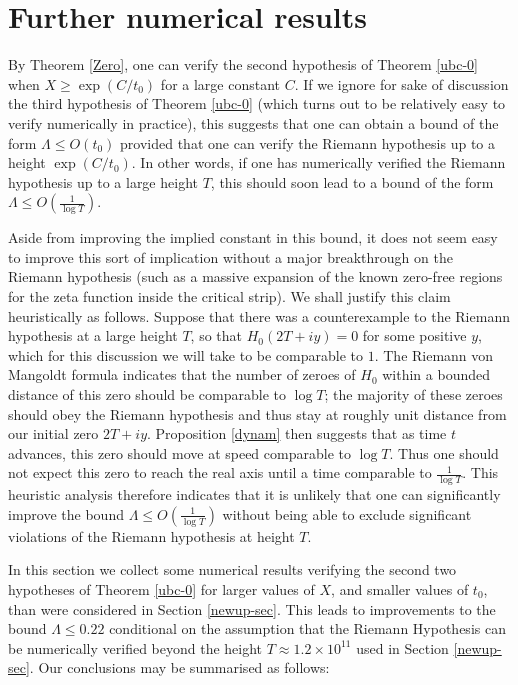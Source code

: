 \section{Further numerical results}\label{further-sec}

By Theorem \ref{Zero}, one can verify the second hypothesis of Theorem \ref{ubc-0} when $X \geq \exp(C/t_0)$ for a large constant $C$.  If we ignore for sake of discussion the third hypothesis of Theorem \ref{ubc-0} (which turns out to be relatively easy to verify numerically in practice), this suggests that one can obtain a bound of the form $\Lambda \leq O(t_0)$ provided that one can verify the Riemann hypothesis up to a height $\exp(C/t_0)$.  In other words, if one has numerically verified the Riemann hypothesis up to a large height $T$, this should soon lead to a bound of the form $\Lambda \leq O \left( \frac{1}{\log T} \right )$.

Aside from improving the implied constant in this bound, it does not seem easy to improve this sort of implication without a major breakthrough on the Riemann hypothesis (such as a massive expansion of the known zero-free regions for the zeta function inside the critical strip).  We shall justify this claim heuristically as follows. Suppose that there was a counterexample to the Riemann hypothesis at a large height $T$, so that $H_0(2T + iy) = 0$ for some positive $y$, which for this discussion we will take to be comparable to $1$.  The Riemann von Mangoldt formula indicates that the number of zeroes of $H_0$ within a bounded distance of this zero should be comparable to $\log T$; the majority of these zeroes should obey the Riemann hypothesis and thus stay at roughly unit distance from our initial zero $2T+iy$.  Proposition \ref{dynam} then suggests that as time $t$ advances, this zero should move at speed comparable to $\log T$.  Thus one should not expect this zero to reach the real axis until a time comparable to $\frac{1}{\log T}$.  This heuristic analysis therefore indicates that it is unlikely that one can significantly improve the bound $\Lambda \leq O \left( \frac{1}{\log T} \right )$ without being able to exclude significant violations of the Riemann hypothesis at height $T$.

In this section we collect some numerical results verifying the second two hypotheses of Theorem \ref{ubc-0} for larger values of $X$, and smaller values of $t_0$, than were considered in Section \ref{newup-sec}.  This leads to improvements to the bound $\Lambda \leq 0.22$ conditional on the assumption that the Riemann Hypothesis can be numerically verified beyond the height $T \approx 1.2 \times 10^{11}$ used in Section \ref{newup-sec}.  Our conclusions may be summarised as follows:

